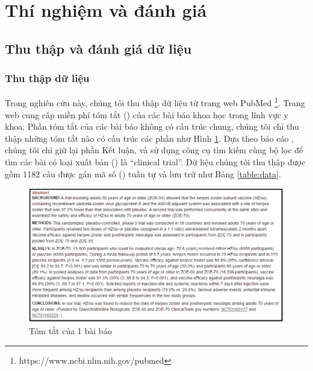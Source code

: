 \section{Thí nghiệm và đánh giá} \label{sec:thi-nghiem-va-danh-gia}
\subsection{Thu thập và đánh giá dữ liệu} \label{sec:thu-thap-va-danh-gia-du-lieu}
\subsubsection*{Thu thập dữ liệu}
Trong nghiên cứu này, chúng tôi thu thập dữ liệu từ trang web PubMed \footnote{https://www.ncbi.nlm.nih.gov/pubmed}. Trang web cung cấp miễn phí tóm tắt () của các bài báo khoa học trong lĩnh vực y khoa. Phần tóm tắt của các bài báo không có cấu trúc chung, chúng tôi chỉ thu thập những tóm tắt nào có cấu trúc các phần như Hình \ref{fig:bai-bao-mau}. Dựa theo báo cáo \cite{niu2005analysis}, chúng tôi chỉ giữ lại phần Kết luận, và sử dụng công cụ tìm kiếm cùng bộ lọc để tìm các bài có loại xuất bản () là ``clinical trial''. Dữ liệu chúng tôi thu thập được gồm 1182 câu được gán mã số () tuần tự và lưu trữ như Bảng \ref{table:data}.
\begin{figure}[H]
\centering
\includegraphics[scale=0.7]{../hinh/bai_bao_mau.png}
\caption{Tóm tắt của 1 bài báo} \label{fig:bai-bao-mau}
\end{figure}

